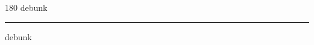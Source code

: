 
\begin{frame}
\begin{center}
\begin{turn}{180}
{\fontsize{2.5cm}{1em}\selectfont debunk}
\end{turn}
\vspace{1em}\par  
\hrule
\vspace{1em}\par  
{\fontsize{2.5cm}{1em}\selectfont debunk}
\end{center}
\end{frame}
